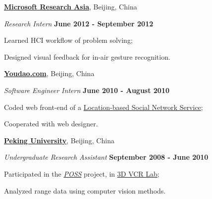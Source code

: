 \documentclass[10pt]{article}
\newenvironment{outerlist}[1][\enskip\textbullet]%
        {\begin{itemize}[#1]}{\end{itemize}%
         \vspace{-.6\baselineskip}}
\newenvironment{innerlist}[1][\enskip\textbullet]%
        {\begin{compactitem}[#1]}{\end{compactitem}}
\newcommand{\blankline}{\quad\pagebreak[2]}
\begin{document}
\blankline

\href{http://research.microsoft.com/hci}{\textbf{Microsoft Research Asia}}, \hfill
Beijing, China
\begin{outerlist}

\item[] \textit{Research Intern}%
        \hfill \textbf{June 2012 - September 2012}
\begin{innerlist}
\item Learned HCI workflow of problem solving;
\item Designed visual feedback for in-air gesture recognition.
\end{innerlist}
\end{outerlist}

\blankline

\href{http://www.youdao.com/}{\textbf{Youdao.com}}, \hfill
Beijing, China
\begin{outerlist}

\item[] \textit{Software Engineer Intern}%
        \hfill \textbf{June 2010 - August 2010}
\begin{innerlist}
\item Coded web front-end of a \href{http://bafang.163.com}{Location-based Social Network Service};
\item Cooperated with web designer.
\end{innerlist}
\end{outerlist}

\blankline

\href{http://www.pku.edu.cn}{\textbf{Peking University}}, \hfill
Beijing, China
\begin{outerlist}

\item[] \textit{Undergraduate Research Assistant}%
        \hfill \textbf{September 2008 - June 2010}
\begin{innerlist}
\item Participated in the \href{http://www.poss.pku.edu.cn/}{\emph{POSS}} project, in
        \href{http://www.cis.pku.edu.cn/vision/3DVCR/3DVCR_E.html}{3D VCR Lab};
\item Analyzed range data using computer vision methods.
\end{innerlist}

\end{outerlist}

\end{document}
